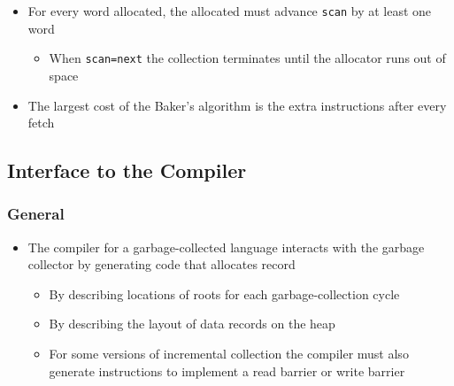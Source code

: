 \documentclass[11pt]{article}
\begin{document}
\begin{itemize}
\begin{itemize}
\begin{itemize}
\begin{itemize}
\end{itemize}
\item For every word allocated, the allocated must advance \texttt{scan} by at least one word
\begin{itemize}
\item When \texttt{scan=next} the collection terminates until the allocator runs out of space
\end{itemize}
\item The largest cost of the Baker's algorithm is the extra instructions after every fetch
\end{itemize}
\end{itemize}
\end{itemize}

\subsection{Interface to the Compiler}
\label{sec:org0816ebb}
\subsubsection{General}
\label{sec:org0e16c43}
\begin{itemize}
\item The compiler for a garbage-collected language interacts with the garbage collector by generating code that allocates record
\begin{itemize}
\item By describing locations of roots for each garbage-collection cycle
\item By describing the layout of data records on the heap
\item For some versions of incremental collection the compiler must also generate instructions to implement a read barrier or write barrier
\end{itemize}
\end{itemize}
\end{document}
